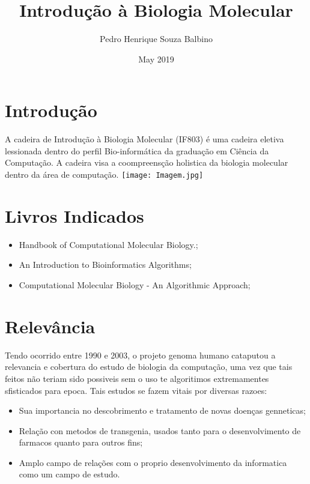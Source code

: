\documentclass{article}
\title{Introdução à Biologia Molecular}
\author{Pedro Henrique Souza Balbino}
\date{May 2019}
\begin{document}
\maketitle

\centering
\section{Introdução}
A cadeira de Introdução à Biologia Molecular (IF803) é uma cadeira eletiva lessionada dentro do perfil Bio-informática da graduação em Ciência da Computação. A cadeira visa a coompreensção holistica da biologia molecular dentro da área de computação.
\texttt{[image: Imagem.jpg]} \centering \citep{desconhecido_2005}

\section{Livros Indicados}
\begin{itemize}
    \item Handbook of Computational Molecular Biology.; \citep{aluru2005handbook}
    \item An Introduction to Bioinformatics Algorithms; \citep{jones2004introduction}
    \item Computational Molecular Biology - An Algorithmic Approach; \citep{pevzner2000computational}
\end{itemize}

\section{Relevância}
Tendo ocorrido entre 1990 e 2003, o projeto genoma humano cataputou a relevancia e cobertura do estudo de biologia da computação, uma vez que tais feitos não teriam sido possiveis sem o uso te algoritimos extremamentes sfisticados para epoca. \hfill \break
Tais estudos se fazem vitais por diversas razoes:

\begin{itemize}
    \item Sua importancia no descobrimento e tratamento de novas doenças genneticas;
    \item Relação con metodos de transgenia, usados tanto para o desenvolvimento de farmacos quanto para outros fins;
    \item Amplo campo de relações com o proprio desenvolvimento da informatica como um campo de estudo.
\end{itemize}
\end{document}
